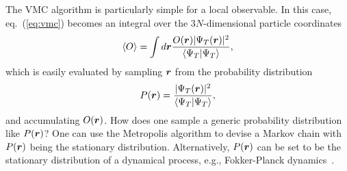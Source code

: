 The VMC algorithm is particularly simple for a local observable. In this case, eq.~(\ref{eq:vmc}) becomes an integral over the $3N$-dimensional particle coordinates
\begin{align}
\braket{O} = \int d\boldsymbol{r} \dfrac{O(\boldsymbol{r})\vert\Psi_T(\boldsymbol{r})\vert^2}{\braket{\Psi_T|\Psi_T}},
\end{align}
which is easily evaluated by sampling $\boldsymbol{r}$ from the probability distribution
\begin{align}
P(\boldsymbol{r}) = \dfrac{\vert\Psi_T(\boldsymbol{r})\vert^2}{\braket{\Psi_T|\Psi_T}},
\end{align}
and accumulating $O(\boldsymbol{r})$. How does one sample a generic probability distribution like $P(\boldsymbol{r})$? One can use the Metropolis algorithm to devise a Markov chain with $P(\boldsymbol{r})$ being the stationary distribution. Alternatively, $P(\boldsymbol{r})$ can be set to be the stationary distribution of a dynamical process, e.g., Fokker-Planck dynamics~\cite{Hammond1994}.

